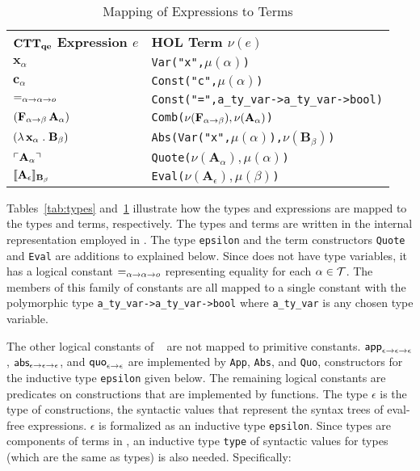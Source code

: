 \documentclass[fleqn]{llncs}
\begin{document}
\begin{table}[t]
\bc
\begin{tabular}{|ll|}
\hline
\textbf{${\bf CTT_{qe}}$ Expression $e$} \hspace*{2ex}
  & \textbf{HOL Term $\nu(e)$}\\
$\textbf{x}_\alpha$
  & \texttt{Var("x",\mbox{$\mu(\alpha)$})}\\
$\textbf{c}_\alpha$
  & \texttt{Const("c",\mbox{$\mu(\alpha)$})}\\
$\mbox{\sf =}_{\alpha \rightarrow \alpha \rightarrow o}$
  & \texttt{Const("=",\texttt{a\_ty\_var->a\_ty\_var->bool})}\\
$(\textbf{F}_{\alpha \rightarrow \beta} \, \textbf{A}_\alpha)$
  & \texttt{Comb(\mbox{\rm $\nu(\textbf{F}_{\alpha \rightarrow \beta}),\nu(\textbf{A}_\alpha)$})}\\
$(\lambda\, \textbf{x}_\alpha \mathrel. \textbf{B}_\beta)$
  & \texttt{Abs(Var("x",\mbox{$\mu(\alpha)$}),\mbox{\rm $\nu(\textbf{B}_\beta)$})}\\
$\ulcorner\textbf{A}_\alpha\urcorner$
  & \texttt{Quote(\mbox{\rm $\nu(\textbf{A}_\alpha),\mu(\alpha)$})}\\
$\llbracket\textbf{A}_\epsilon\rrbracket_{{\bf B}_\beta}$
  & \texttt{Eval(\mbox{\rm $\nu(\textbf{A}_\epsilon),\mu(\beta)$})}\\
\hline
\end{tabular}
\ec
\caption{Mapping of {\churchqe} Expressions to {\HOL} Terms}\label{tab:expressions} 
\end{table}

Tables~\ref{tab:types} and~\ref{tab:expressions} illustrate how the
{\churchqe} types and expressions are mapped to the {\HOL} types and
terms, respectively.  The {\HOL} types and terms are written in 
the internal representation employed in {\HLQE}.  The type
\texttt{epsilon} and the term constructors \texttt{Quote} and
\texttt{Eval} are additions to {\HL} explained below.  Since
{\churchqe} does not have type variables, it has a logical constant
$\mbox{\sf =}_{\alpha \rightarrow \alpha \rightarrow o}$ representing equality
for each $\alpha \in \mbox{$\cal T$}$.  The members of this family of constants
are all mapped to a single {\HOL} constant with the polymorphic type
\texttt{a\_ty\_var->a\_ty\_var->bool} where \texttt{a\_ty\_var} is any
chosen {\HOL} type variable.  

The other logical constants of {\churchqe}~\cite[Table 1]{Farmer18}
are not mapped to primitive {\HOL} constants.  $\mbox{\sf app}_{\epsilon
  \rightarrow \epsilon \rightarrow \epsilon}$, $\mbox{\sf abs}_{\epsilon \rightarrow
  \epsilon \rightarrow \epsilon}$, and $\mbox{\sf quo}_{\epsilon \rightarrow
  \epsilon}$ are implemented by \texttt{App}, \texttt{Abs}, and
\texttt{Quo}, constructors for the inductive type \texttt{epsilon}
given below.  The remaining logical constants are predicates on
constructions that are implemented by {\HOL} functions.
The {\churchqe} type $\epsilon$ is the type of constructions, the
syntactic values that represent the syntax trees of eval-free
expressions.  $\epsilon$ is formalized as an inductive type
\texttt{epsilon}.  Since types are components of terms in
{\HL}, an inductive type \texttt{type} of syntactic values for
{\HLQE} types (which are the same as {\HOL} types) is also
needed.  Specifically:
\end{document}
